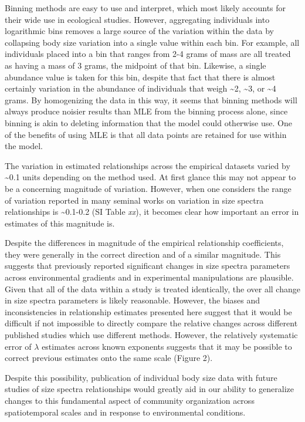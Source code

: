 \documentclass[
]{article}
\begin{document}
Binning methods are easy to use and interpret, which most likely
accounts for their wide use in ecological studies. However, aggregating
individuals into logarithmic bins removes a large source of the
variation within the data by collapsing body size variation into a
single value within each bin. For example, all individuals placed into a
bin that ranges from 2-4 grams of mass are all treated as having a mass
of 3 grams, the midpoint of that bin. Likewise, a single abundance value
is taken for this bin, despite that fact that there is almost certainly
variation in the abundance of individuals that weigh \textasciitilde2,
\textasciitilde3, or \textasciitilde4 grams. By homogenizing the data in
this way, it seems that binning methods will always produce noisier
results than MLE from the binning process alone, since binning is akin
to deleting information that the model could otherwise use. One of the
benefits of using MLE is that all data points are retained for use
within the model.

The variation in estimated relationships across the empirical datasets
varied by \textasciitilde0.1 units depending on the method used. At
first glance this may not appear to be a concerning magnitude of
variation. However, when one considers the range of variation reported
in many seminal works on variation in size spectra relationships is
\textasciitilde0.1-0.2 (SI Table \emph{xx}), it becomes clear how
important an error in estimates of this magnitude is.

Despite the differences in magnitude of the empirical relationship
coefficients, they were generally in the correct direction and of a
similar magnitude. This suggests that previously reported significant
changes in size spectra parameters across environmental gradients and in
experimental manipulations are plausible. Given that all of the data
within a study is treated identically, the over all change in size
spectra parameters is likely reasonable. However, the biases and
inconsistencies in relationship estimates presented here suggest that it
would be difficult if not impossible to directly compare the relative
changes across different published studies which use different methods.
However, the relatively systematic error of \(\lambda\) estimates across
known exponents suggests that it may be possible to correct previous
estimates onto the same scale (Figure 2).

Despite this possibility, publication of individual body size data with
future studies of size spectra relationships would greatly aid in our
ability to generalize changes to this fundamental aspect of community
organization across spatiotemporal scales and in response to
environmental conditions.
\end{document}
